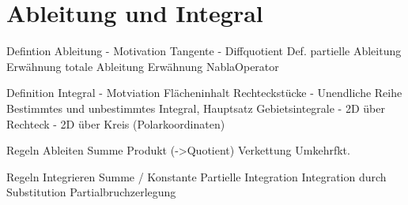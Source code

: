 \chapter{Ableitung und Integral}

Defintion Ableitung
  - Motivation Tangente
  - Diffquotient
Def. partielle Ableitung
Erwähnung totale Ableitung
Erwähnung NablaOperator

Definition Integral
 - Motviation Flächeninhalt Rechteckstücke
 - Unendliche Reihe
Bestimmtes und unbestimmtes Integral, Hauptsatz
  Gebietsintegrale
    - 2D über Rechteck
    - 2D über Kreis (Polarkoordinaten)

Regeln Ableiten
  Summe
  Produkt (->Quotient)
  Verkettung
  Umkehrfkt.

Regeln Integrieren
  Summe / Konstante
  Partielle Integration
  Integration durch Substitution
  Partialbruchzerlegung

